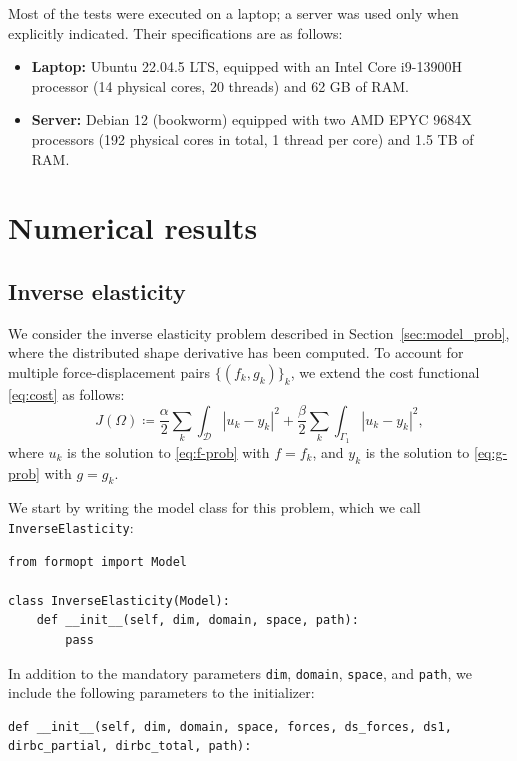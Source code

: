\documentclass[iicol,pdflatex,sn-mathphys-ay]{sn-jnl}%
\theoremstyle{thmstyleone}%
\theoremstyle{thmstyletwo}%
\theoremstyle{thmstylethree}%
\begin{document}
Most of the tests were executed on a laptop; a server was used only
when explicitly indicated. Their specifications are as follows:
\begin{itemize}
\item \textbf{Laptop:} Ubuntu 22.04.5 LTS, equipped with an Intel Core i9-13900H
processor (14 physical cores, 20 threads) and 62 GB of RAM.
\item \textbf{Server:} Debian 12 (bookworm) equipped with two AMD EPYC 9684X
processors (192 physical cores in total, 1 thread per core) and 1.5 TB of RAM.
\end{itemize}


\section{Numerical results}\label{sec:results}

\subsection{Inverse elasticity}\label{sec:num_inverse_elasticity}

We consider the inverse elasticity problem
described in Section~\ref{sec:model_prob},
where the distributed shape derivative has been computed.
To account for multiple force-displacement pairs $\{(f_k, g_k)\}_k$,
we extend the cost functional \eqref{eq:cost} as follows:
\begin{equation}
	J(\Omega)\coloneqq
	\frac{\alpha}{2}\sum_{k}\int_{\mathcal{D}}|u_{k}-y_{k}|^{2}+
	\frac{\beta}{2}\sum_{k}\int_{\Gamma_{1}}|u_{k}-y_{k}|^{2},
\end{equation}
where $u_k$ is the solution to \eqref{eq:f-prob} with $f=f_k$,
and $y_k$ is the solution to \eqref{eq:g-prob} with $g=g_k$.

We start by writing the model class for this problem,
which we call \texttt{InverseElasticity}:
\begin{lstlisting}
from formopt import Model

class InverseElasticity(Model):
	def __init__(self, dim, domain, space, path):
		pass
\end{lstlisting}
In addition to the mandatory parameters
\texttt{dim}, \texttt{domain}, \texttt{space}, and \texttt{path},
we include the following parameters to the initializer:
\begin{lstlisting}
def __init__(self, dim, domain, space, forces, ds_forces, ds1, dirbc_partial, dirbc_total, path):
\end{lstlisting}
\end{document}
